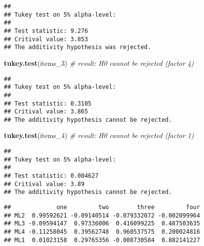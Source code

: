 \documentclass[
]{article}
\newenvironment{Shaded}{\begin{snugshade}}{\end{snugshade}}
\newcommand{\CommentTok}[1]{\textcolor[rgb]{0.56,0.35,0.01}{\textit{#1}}}
\newcommand{\DataTypeTok}[1]{\textcolor[rgb]{0.13,0.29,0.53}{#1}}
\newcommand{\DecValTok}[1]{\textcolor[rgb]{0.00,0.00,0.81}{#1}}
\newcommand{\KeywordTok}[1]{\textcolor[rgb]{0.13,0.29,0.53}{\textbf{#1}}}
\newcommand{\NormalTok}[1]{#1}
\newcommand{\OperatorTok}[1]{\textcolor[rgb]{0.81,0.36,0.00}{\textbf{#1}}}
\newcommand{\StringTok}[1]{\textcolor[rgb]{0.31,0.60,0.02}{#1}}
\begin{document}
\begin{verbatim}
## 
## Tukey test on 5% alpha-level:
## 
## Test statistic: 9.276 
## Critival value: 3.853 
## The additivity hypothesis was rejected.
\end{verbatim}

\begin{Shaded}
\begin{Highlighting}[]
\KeywordTok{tukey.test}\NormalTok{(items_}\DecValTok{3}\NormalTok{) }\CommentTok{# result: H0 cannot be rejected (factor 4)}
\end{Highlighting}
\end{Shaded}

\begin{verbatim}
## 
## Tukey test on 5% alpha-level:
## 
## Test statistic: 0.3105 
## Critival value: 3.865 
## The additivity hypothesis cannot be rejected.
\end{verbatim}

\begin{Shaded}
\begin{Highlighting}[]
\KeywordTok{tukey.test}\NormalTok{(items_}\DecValTok{4}\NormalTok{) }\CommentTok{# result: H0 cannot be rejected (factor 1)}
\end{Highlighting}
\end{Shaded}

\begin{verbatim}
## 
## Tukey test on 5% alpha-level:
## 
## Test statistic: 0.004627 
## Critival value: 3.89 
## The additivity hypothesis cannot be rejected.
\end{verbatim}

\begin{Shaded}
\end{Shaded}

\begin{verbatim}
##             one         two        three         four
## ML2  0.99592621 -0.09140514 -0.079332072 -0.002099964
## ML3 -0.09594147  0.97336006  0.416099225  0.487503635
## ML4 -0.11258045  0.39562748  0.960537575  0.200024816
## ML1  0.01023158  0.29765356 -0.008730584  0.882141227
\end{verbatim}

\begin{Shaded}
\end{Shaded}
\end{document}
